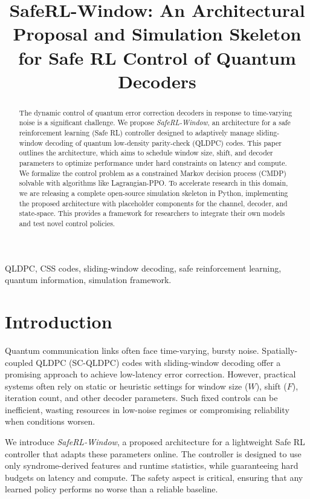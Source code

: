 \documentclass[conference]{IEEEtran}
\title{SafeRL-Window: An Architectural Proposal and Simulation Skeleton for Safe RL Control of Quantum Decoders}
\author{
\IEEEauthorblockN{Agentic Research Group}
\IEEEauthorblockA{
Email: agent@research.com}
}
\begin{document}
\maketitle

\begin{abstract}
The dynamic control of quantum error correction decoders in response to time-varying noise is a significant challenge. We propose \emph{SafeRL-Window}, an architecture for a safe reinforcement learning (Safe RL) controller designed to adaptively manage sliding-window decoding of quantum low-density parity-check (QLDPC) codes. This paper outlines the architecture, which aims to schedule window size, shift, and decoder parameters to optimize performance under hard constraints on latency and compute. We formalize the control problem as a constrained Markov decision process (CMDP) solvable with algorithms like Lagrangian-PPO. To accelerate research in this domain, we are releasing a complete open-source simulation skeleton in Python, implementing the proposed architecture with placeholder components for the channel, decoder, and state-space. This provides a framework for researchers to integrate their own models and test novel control policies.
\end{abstract}

\begin{IEEEkeywords}
QLDPC, CSS codes, sliding-window decoding, safe reinforcement learning, quantum information, simulation framework.
\end{IEEEkeywords}

\section{Introduction}
Quantum communication links often face time-varying, bursty noise. Spatially-coupled QLDPC (SC-QLDPC) codes with sliding-window decoding offer a promising approach to achieve low-latency error correction. However, practical systems often rely on static or heuristic settings for window size ($W$), shift ($F$), iteration count, and other decoder parameters. Such fixed controls can be inefficient, wasting resources in low-noise regimes or compromising reliability when conditions worsen.

We introduce \emph{SafeRL-Window}, a proposed architecture for a lightweight Safe RL controller that adapts these parameters online. The controller is designed to use only syndrome-derived features and runtime statistics, while guaranteeing hard budgets on latency and compute. The safety aspect is critical, ensuring that any learned policy performs no worse than a reliable baseline.
\end{document}
